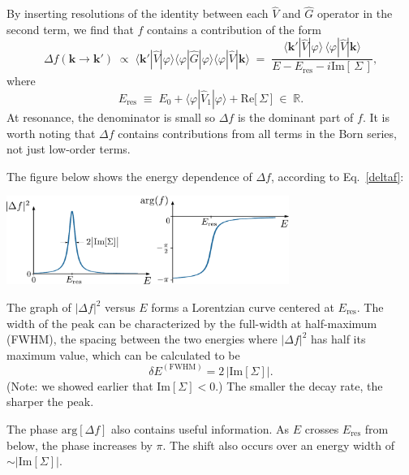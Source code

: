 \documentclass[pra,12pt]{revtex4-2}
\begin{document}
By inserting resolutions of the identity between each $\hat{V}$ and
$\hat{G}$ operator in the second term, we find that $f$ contains a
contribution of the form
\begin{equation}
  \Delta f(\mathbf{k}\rightarrow\mathbf{k}') \;\propto\; \langle \mathbf{k}'|\hat{V}|\varphi\rangle\langle\varphi|\hat{G}|\varphi\rangle\langle\varphi|\hat{V}|\mathbf{k}\rangle \;=\; \frac{\langle \mathbf{k}'|\hat{V}|\varphi\rangle \, \langle\varphi|\hat{V}|\mathbf{k}\rangle}{\displaystyle E - E_{\mathrm{res}} - i \mathrm{Im}[\,\Sigma\,]},
  \label{deltaf}
\end{equation}
where
\begin{equation}
  E_{\mathrm{res}} \;\equiv\; E_0 + \langle\varphi|\hat{V}_1|\varphi\rangle + \mathrm{Re}\big[\,\Sigma\,\big] \;\in\; \mathbb{R}.
  \label{Eres}
\end{equation}
At resonance, the denominator is small so $\Delta f$ is the dominant
part of $f$.  It is worth noting that $\Delta f$ contains
contributions from all terms in the Born series, not just low-order
terms.

The figure below shows the energy dependence of $\Delta f$, according
to Eq.~\eqref{deltaf}:

\begin{center}
  \includegraphics[width=0.69\textwidth]{resonance}  
\end{center}

\noindent
The graph of $|\Delta f|^2$ versus $E$ forms a Lorentzian curve
centered at $E_{\mathrm{res}}$.  The width of the peak can be
characterized by the full-width at half-maximum (FWHM), the spacing
between the two energies where $|\Delta f|^2$ has half its maximum
value, which can be calculated to be
\begin{equation}
  \delta E^{(\mathrm{FWHM})} = 2\, \big|\mathrm{Im}[\Sigma]\big|.
\end{equation}
(Note: we showed earlier that $\mathrm{Im}[\Sigma] < 0$.)  The smaller
the decay rate, the sharper the peak.

The phase $\mathrm{arg}[\Delta f]$ also contains useful information.
As $E$ crosses $E_{\mathrm{res}}$ from below, the phase increases by
$\pi$.  The shift also occurs over an energy width of $\sim
|\mathrm{Im}[\Sigma]|$.
\end{document}
